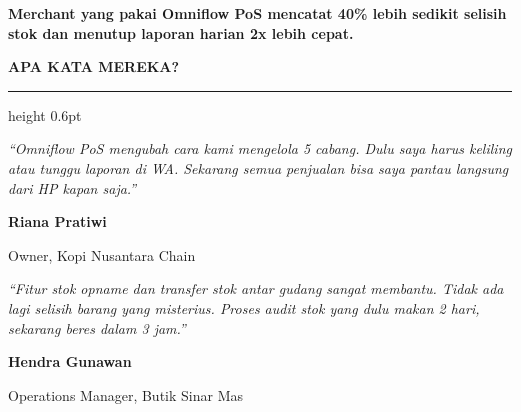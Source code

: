 \documentclass[a4paper]{article}
\newcommand{\sectiontitle}[1]{%
    \vspace{10pt}%
    {\fontsize{13}{16}\selectfont\bfseries\color{BlueDark} #1}\par\vspace{3pt}%
    {\color{BluePrimary}\hrule height 0.6pt}\par\vspace{8pt}%
}
\begin{document}
\vspace{8pt}

{\setlength{\fboxsep}{7pt}\setlength{\fboxrule}{0pt}%
\noindent\colorbox{AmberPrimary}{%
    \begin{minipage}{\dimexpr\textwidth-2\fboxsep\relax}
        \centering
        {\fontsize{9.5}{12}\selectfont\bfseries\color{White}
        Merchant yang pakai Omniflow PoS mencatat \textbf{40\% lebih sedikit selisih stok} dan menutup laporan harian \textbf{2x lebih cepat}.}
    \end{minipage}}}

\vspace{8pt}
\sectiontitle{APA KATA MEREKA?}

\noindent
\begin{minipage}[t]{0.485\textwidth}
    \colorbox{BlueBg}{%
        \begin{minipage}{\dimexpr\linewidth-2\fboxsep\relax}
            {\fontsize{9.5}{13}\selectfont\color{TextDark}\textit{``Omniflow PoS mengubah cara kami mengelola 5 cabang. Dulu saya harus keliling atau tunggu laporan di WA. Sekarang semua penjualan bisa saya pantau langsung dari HP kapan saja.''}}\par\vspace{4pt}
            {\fontsize{8.5}{11}\selectfont\bfseries\color{BluePrimary} Riana Pratiwi}\par
            {\fontsize{8}{10}\selectfont\color{TextLight} Owner, Kopi Nusantara Chain}
        \end{minipage}}
\end{minipage}%
\hfill
\begin{minipage}[t]{0.485\textwidth}
    \colorbox{BlueBg}{%
        \begin{minipage}{\dimexpr\linewidth-2\fboxsep\relax}
            {\fontsize{9.5}{13}\selectfont\color{TextDark}\textit{``Fitur stok opname dan transfer stok antar gudang sangat membantu. Tidak ada lagi selisih barang yang misterius. Proses audit stok yang dulu makan 2 hari, sekarang beres dalam 3 jam.''}}\par\vspace{4pt}
            {\fontsize{8.5}{11}\selectfont\bfseries\color{BluePrimary} Hendra Gunawan}\par
            {\fontsize{8}{10}\selectfont\color{TextLight} Operations Manager, Butik Sinar Mas}
        \end{minipage}}
\end{minipage}

\restoregeometry
\end{document}

